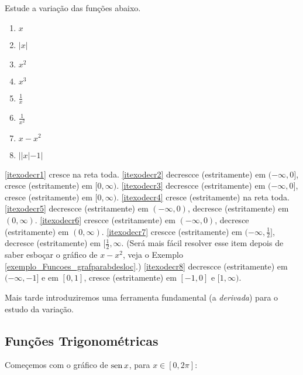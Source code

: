 \begin{exo}
Estude a variação das funções abaixo.
\begin{multicols}{4}
\begin{enumerate}
\item\label{itexodecr1} $x$
\item \label{itexodecr2}$|x|$
\item \label{itexodecr3}$x^2$
\item \label{itexodecr4}$x^3$
\item \label{itexodecr5}$\frac{1}{x}$
\item \label{itexodecr6}$\frac{1}{x^2}$
\item \label{itexodecr7}$x-x^2$
\item \label{itexodecr8}$||x|-1|$
\end{enumerate}
\end{multicols}
\vspace{0.05cm}
\begin{sol}
\eqref{itexodecr1} cresce na reta toda.
\eqref{itexodecr2} decrescce (estritamente) em $(-\infty,0]$, cresce (estritamente) em $[0,\infty)$.
\eqref{itexodecr3} decrescce (estritamente) em $(-\infty,0]$, cresce (estritamente) em $[0,\infty)$.
\eqref{itexodecr4}  cresce (estritamente) na reta toda.
\eqref{itexodecr5} decrescce (estritamente) em $(-\infty,0)$, decresce (estritamente) em $(0,\infty)$.
\eqref{itexodecr6} crescce (estritamente) em $(-\infty,0)$, decresce (estritamente) em $(0,\infty)$.
\eqref{itexodecr7} crescce (estritamente) em $(-\infty,\tfrac12]$, decresce (estritamente) em
$[\tfrac12,\infty$. (Será mais fácil resolver esse item depois de saber esboçar o gráfico de $x-x^2$,
veja o Exemplo \ref{exemplo_Funcoes_grafparabdesloc}.)
\eqref{itexodecr8} decrescce (estritamente) em $(-\infty,-1]$ e em $[0,1]$, 
cresce (estritamente) em $[-1,0]$ e $[1,\infty)$.
\end{sol}
\end{exo}

Mais tarde introduziremos uma ferramenta fundamental (a \emph{derivada}) para o estudo da variação.

\subsection{Funções Trigonométricas}\label{Sec:GraficosTrigo}
Começemos com o gráfico de $\operatorname{sen} x$, para $x\in [0,2\pi]$:

